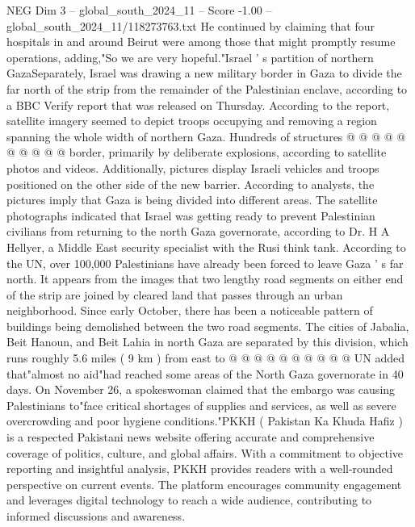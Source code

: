 \begin{textsample}{NEG Dim 3 – global\_south\_2024\_11 – Score -1.00 – global\_south\_2024\_11/118273763.txt}
He continued by claiming that four hospitals in and around Beirut were among those that might promptly resume operations, adding,"So we are very hopeful."Israel ' s partition of northern GazaSeparately, Israel was drawing a new military border in Gaza to divide the far north of the strip from the remainder of the Palestinian enclave, according to a BBC Verify report that was released on Thursday.
According to the report, satellite imagery seemed to depict troops occupying and removing a region spanning the whole width of northern Gaza.
Hundreds of structures @ @ @ @ @ @ @ @ @ @ border, primarily by deliberate explosions, according to satellite photos and videos.
Additionally, pictures display Israeli vehicles and troops positioned on the other side of the new barrier.
According to analysts, the pictures imply that Gaza is being divided into different areas.
The satellite photographs indicated that Israel was getting ready to prevent Palestinian civilians from returning to the north Gaza governorate, according to Dr.
H A Hellyer, a Middle East security specialist with the Rusi think tank.
According to the UN, over 100,000 Palestinians have already been forced to leave Gaza ' s far north.
It appears from the images that two lengthy road segments on either end of the strip are joined by cleared land that passes through an urban neighborhood.
Since early October, there has been a noticeable pattern of buildings being demolished between the two road segments.
The cities of Jabalia, Beit Hanoun, and Beit Lahia in north Gaza are separated by this division, which runs roughly 5.6 miles ( 9 km ) from east to @ @ @ @ @ @ @ @ @ @ UN added that"almost no aid"had reached some areas of the North Gaza governorate in 40 days.
On November 26, a spokeswoman claimed that the embargo was causing Palestinians to"face critical shortages of supplies and services, as well as severe overcrowding and poor hygiene conditions."PKKH ( Pakistan Ka Khuda Hafiz ) is a respected Pakistani news website offering accurate and comprehensive coverage of politics, culture, and global affairs.
With a commitment to objective reporting and insightful analysis, PKKH provides readers with a well-rounded perspective on current events.
The platform encourages community engagement and leverages digital technology to reach a wide audience, contributing to informed discussions and awareness.

\end{textsample}
